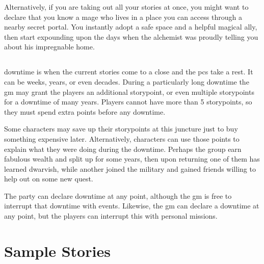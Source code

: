 \begin{multicols}{2}
Alternatively, if you are taking out all your stories at once, you might want to declare that you know a mage who lives in a place you can access through a nearby secret portal.
You instantly adopt a safe space and a helpful magical ally, then start expounding upon the days when the alchemist was proudly telling you about his impregnable home.

\subsection{}

\Gls{downtime} is when the current stories come to a close and the \glspl{pc} take a rest.
It can be weeks, years, or even decades.
During a particularly long \gls{downtime} the \gls{gm} may grant the players an additional \gls{storypoint}, or even multiple \glspl{storypoint} for a downtime of many years.
Players cannot have more than 5 \glspl{storypoint}, so they must spend extra points before any \gls{downtime}.

Some characters may save up their \glspl{storypoint} at this juncture just to buy something expensive later.
Alternatively, characters can use those points to explain what they were doing during the \gls{downtime}.
Perhaps the group earn fabulous wealth and split up for some years, then upon returning one of them has learned dwarvish, while another joined the military and gained friends willing to help out on some new quest.

The party can declare \gls{downtime} at any point, although the \gls{gm} is free to interrupt that \gls{downtime} with events.
Likewise, the \gls{gm} can declare a \gls{downtime} at any point, but the players can interrupt this with personal missions.

\end{multicols}

\section{Sample Stories}

